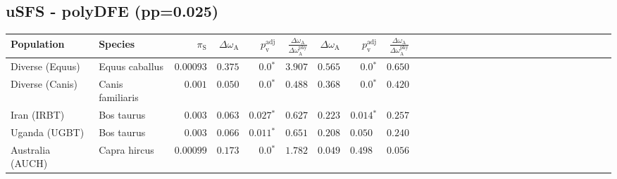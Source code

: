 \subsection{uSFS - polyDFE (pp=0.025)} 
\begin{center}
\begin{adjustbox}{width = 1\textwidth}
\begin{tabular}{|l|l|r|r|r|r|r|r|r|r|r|r|r|r|r|r|r|r|r|r|r|r|r|r|r|r|r|r|r|}
\toprule
                     Population &              Species & $\pi_{\textrm{S}}$ & $\Delta \omega_{\mathrm{A}} $ & $p_{\mathrm{v}}^{\mathrm{adj}}$ & $\frac{\Delta\omega_{\mathrm{A}}}{\Delta\omega_{\mathrm{A}}^{\mathrm{phy}}}$ & $\Delta \omega_{\mathrm{A}} $ & $p_{\mathrm{v}}^{\mathrm{adj}}$ & $\frac{\Delta\omega_{\mathrm{A}}}{\Delta\omega_{\mathrm{A}}^{\mathrm{phy}}}$ \\
\midrule
                Diverse (Equus) &       Equus caballus &          $0.00093$ &                      $ 0.375$ &                  $\bm{0.0{^*}}$ &                                           $ 3.907$ &                      $ 0.565$ &                  $\bm{0.0{^*}}$ &                                           $ 0.650$ \\
                Diverse (Canis) &     Canis familiaris &           $ 0.001$ &                      $ 0.050$ &                  $\bm{0.0{^*}}$ &                                           $ 0.488$ &                      $ 0.368$ &                  $\bm{0.0{^*}}$ &                                           $ 0.420$ \\
                    Iran (IRBT) &           Bos taurus &           $ 0.003$ &                      $ 0.063$ &               $\bm{ 0.027{^*}}$ &                                           $ 0.627$ &                      $ 0.223$ &               $\bm{ 0.014{^*}}$ &                                           $ 0.257$ \\
                  Uganda (UGBT) &           Bos taurus &           $ 0.003$ &                      $ 0.066$ &               $\bm{ 0.011{^*}}$ &                                           $ 0.651$ &                      $ 0.208$ &                      $ 0.050~~$ &                                           $ 0.240$ \\
               Australia (AUCH) &         Capra hircus &          $0.00099$ &                      $ 0.173$ &                  $\bm{0.0{^*}}$ &                                           $ 1.782$ &                      $ 0.049$ &                      $ 0.498~~$ &                                           $ 0.056$ \\

\end{tabular}
\end{adjustbox}
\end{center}
